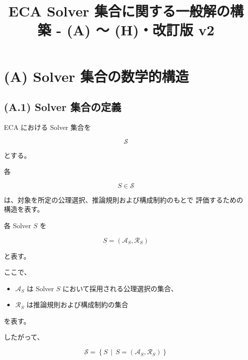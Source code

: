 \documentclass[a4paper,11pt]{article}
\title{ECA Solver 集合に関する一般解の構築 - (A) 〜 (H)・改訂版 v2}
\author{}
\date{}
\newcommand{\Solver}{\mathcal{S}}
\newcommand{\Aset}{\mathcal{A}}
\newcommand{\Rset}{\mathcal{R}}
\begin{document}
\maketitle


\section{(A) Solver 集合の数学的構造}
\label{sec:A}

\subsection{(A.1) Solver 集合の定義}
\label{subsec:A1}

ECA における Solver 集合を

\begin{equation}
    \Solver
\end{equation}

とする。

各

\begin{equation}
    S\in\Solver
\end{equation}

は、対象を所定の公理選択、推論規則および構成制約のもとで
評価するための構造を表す。

各 Solver $S$ を

\begin{equation}
    \boxed{
        S=
        \left(
            \Aset_S,
            \Rset_S
        \right)
    }
    \label{eq:A-solver-structure}
\end{equation}

と表す。

ここで、

\begin{itemize}
    \item $\Aset_S$ は Solver $S$ において採用される公理選択の集合、
    \item $\Rset_S$ は推論規則および構成制約の集合
\end{itemize}

を表す。

したがって、

\begin{equation}
    \Solver
    =
    \left\{
        S
        \,\middle|\,
        S=
        \left(
            \Aset_S,
            \Rset_S
        \right)
    \right\}
    \label{eq:A-solver-set}
\end{equation}
\end{document}
